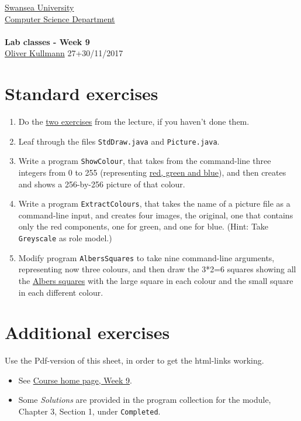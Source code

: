 \documentclass[11pt]{article}
\newcommand{\Java}{\lstset{language=Java,keywordstyle=\bfseries,breaklines,breakindent=30pt}}
\begin{document}
\begin{center}
  \href{http://www.swan.ac.uk/}{Swansea University}\\
  \href{http://www.swan.ac.uk/compsci/}{Computer Science Department}\\[1ex]
  \href{\chp}{\module}\\[1ex]
  \textbf{Lab classes - Week 9}\\
  \href{http://cs.swan.ac.uk/~csoliver}{Oliver Kullmann} 27+30/11/2017
\end{center}


\section{Standard exercises}
\label{sec:stdex}

\Java

\begin{enumerate}
\item Do the \href{\chp#PractiseLectureWeek09}{two exercises} from the lecture, if you haven't done them.
\item Leaf through the files \texttt{StdDraw.java} and \texttt{Picture.java}.
\item Write a program \texttt{ShowColour}, that takes from the command-line three integers from 0 to 255 (representing \href{http://en.wikipedia.org/wiki/RGB_color_model}{red, green and blue}), and then creates and shows a 256-by-256 picture of that colour.
\item Write a program \texttt{ExtractColours}, that takes the name of a picture file as a command-line input, and creates four images, the original, one that contains only the red components, one for green, and one for blue. (Hint: Take \texttt{Greyscale} as role model.)
\item Modify program \texttt{AlbersSquares} to take nine command-line arguments, representing now three colours, and then draw the 3*2=6 squares showing all the \href{http://en.wikipedia.org/wiki/Josef_Albers}{Albers squares} with the large square in each colour and the small square in each different colour.
\end{enumerate}


\section{Additional exercises}
\label{sec:addex}

Use the Pdf-version of this sheet, in order to get the html-links working.
\begin{itemize}
\item See \href{\chp#ExercisesWeek09}{Course home page, Week 9}.
\item Some \emph{Solutions} are provided in the program collection for the module, Chapter 3, Section 1, under \texttt{Completed}.
\end{itemize}
\end{document}
